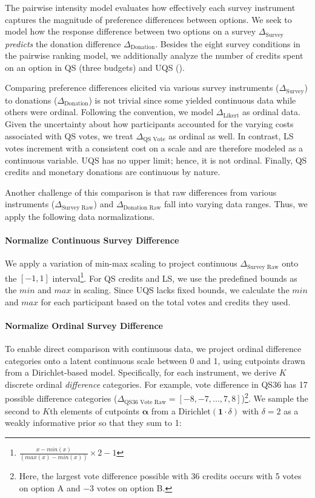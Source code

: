 The pairwise intensity model evaluates how effectively each survey instrument captures the magnitude of preference differences between options. We seek to model how the response difference between two options on a survey $\Delta_{\text{Survey}}$ \emph{predicts} the donation difference $\Delta_{\text{Donation}}$. Besides the eight survey conditions in the pairwise ranking model, we additionally analyze the number of credits spent on an option in QS (three budgets) and UQS ().

Comparing preference differences elicited via various survey instruments ($\Delta_{\text{Survey}}$) to donations ($\Delta_{\text{Donation}}$) is not trivial since some yielded continuous data while others were ordinal. Following the convention, we model $\Delta_{\text{Likert}}$ as ordinal data. Given the uncertainty about how participants accounted for the varying costs associated with QS votes, we treat $\Delta_{\text{QS Vote}}$ as ordinal as well. In contrast, LS votes increment with a consistent cost on a scale and are therefore modeled as a continuous variable. UQS has no upper limit; hence, it is not ordinal. Finally, QS credits and monetary donations are continuous by nature.

Another challenge of this comparison is that raw differences from various instruments ($\Delta_{\text{Survey Raw}}$) and $\Delta_{\text{Donation Raw}}$ fall into varying data ranges. Thus, we apply the following data normalizations.

\paragraph{Normalize Continuous Survey Difference} We apply a variation of min-max scaling to project continuous $\Delta_{\text{Survey Raw}}$ onto the $[-1,1]$ interval\footnote{$\frac{x-min(x)}{(max(x) - min(x))}\times 2 - 1$}. For QS credits and LS, we use the predefined bounds as the $min$ and $max$ in scaling. Since UQS lacks fixed bounds, we calculate the $min$ and $max$ for each participant based on the total votes and credits they used.

\paragraph{Normalize Ordinal Survey Difference} 
To enable direct comparison with continuous data, we project ordinal difference categories onto a latent continuous scale between 0 and 1, using cutpoints drawn from a Dirichlet-based model. Specifically, for each instrument, we derive $K$ discrete ordinal \emph{difference} categories. For example, vote difference in QS36 has 17 possible difference categories ($\Delta_{\text{QS36 Vote Raw}} = [-8, -7, ..., 7, 8]$)\footnote{Here, the largest vote difference possible with 36 credits occurs with 5 votes on option A and $-3$ votes on option B.}. We sample the second to $K$th elements of cutpoints \(\boldsymbol{\alpha}\) from a Dirichlet$(\mathbf{1}\cdot\delta)$ with $\delta=2$ as a weakly informative prior so that they sum to 1:

